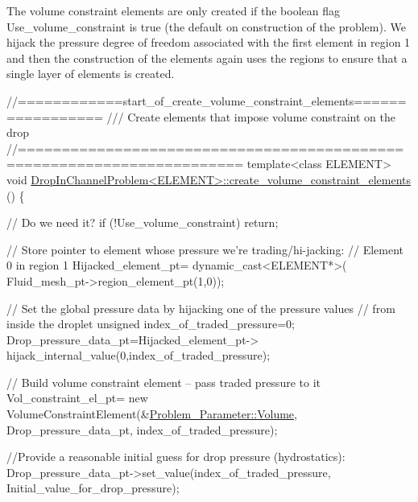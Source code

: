 The volume constraint elements are only created if the boolean flag {\ttfamily Use\+\_\+volume\+\_\+constraint} is true (the default on construction of the problem). We hijack the pressure degree of freedom associated with the first element in region 1 and then the construction of the elements again uses the regions to ensure that a single layer of elements is created.


\begin{DoxyCodeInclude}
\textcolor{comment}{//============start\_of\_create\_volume\_constraint\_elements=================}
\textcolor{comment}{/// Create elements that impose volume constraint on the drop}
\textcolor{comment}{}\textcolor{comment}{//=======================================================================}
\textcolor{keyword}{template}<\textcolor{keyword}{class} ELEMENT>
\textcolor{keywordtype}{void} \hyperlink{classDropInChannelProblem_a53b96cd50b4e6c9bee294b8fb7dd51bd}{DropInChannelProblem<ELEMENT>::create\_volume\_constraint\_elements}
      ()
\{ 

 \textcolor{comment}{// Do we need it?}
 \textcolor{keywordflow}{if} (!Use\_volume\_constraint) \textcolor{keywordflow}{return};

 \textcolor{comment}{// Store pointer to element whose pressure we're trading/hi-jacking:}
 \textcolor{comment}{// Element 0 in region 1}
 Hijacked\_element\_pt= \textcolor{keyword}{dynamic\_cast<}ELEMENT*\textcolor{keyword}{>}(
  Fluid\_mesh\_pt->region\_element\_pt(1,0));

 \textcolor{comment}{// Set the global pressure data by hijacking one of the pressure values}
 \textcolor{comment}{// from inside the droplet}
 \textcolor{keywordtype}{unsigned} index\_of\_traded\_pressure=0;
 Drop\_pressure\_data\_pt=Hijacked\_element\_pt->
  hijack\_internal\_value(0,index\_of\_traded\_pressure);
 
 \textcolor{comment}{// Build volume constraint element -- pass traded pressure to it}
 Vol\_constraint\_el\_pt= 
  \textcolor{keyword}{new} VolumeConstraintElement(&\hyperlink{namespaceProblem__Parameter_aad8e0a2d1ec39a8dd7357a43bcc5f20e}{Problem\_Parameter::Volume},
                              Drop\_pressure\_data\_pt,
                              index\_of\_traded\_pressure);

  \textcolor{comment}{//Provide a reasonable initial guess for drop pressure (hydrostatics):}
 Drop\_pressure\_data\_pt->set\_value(index\_of\_traded\_pressure,
                                    Initial\_value\_for\_drop\_pressure);


\end{DoxyCodeInclude}
